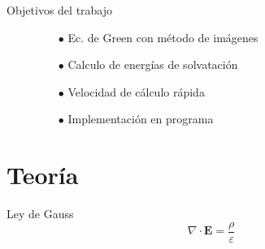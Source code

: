 \documentclass[serif,usenames,dvipsnames,landscape]{beamer}
\begin{document}
\begin{frame}{Objetivos del trabajo}
	\begin{figure}
		\begin{minipage}{0.4\slidewidth}
			\begin{itemize}
				\item[$\bullet$] Ec. de Green con método de imágenes
				\item[$\bullet$] Calculo de energías de solvatación
			\end{itemize}
		\end{minipage}%
		\vspace{1cm}
		\begin{minipage}{0.4\slidewidth}
			\begin{itemize}
				\item[$\bullet$] Velocidad de cálculo rápida
				\item[$\bullet$] Implementación en programa
			\end{itemize}
		\end{minipage}
		\begin{minipage}{0.55\slidewidth}
			
		\end{minipage}
		\vspace{-0.8cm}
	\end{figure}
\end{frame}

\section{Teoría}
	\begin{frame}{Ley de Gauss}
		\begin{equation*}
			\nabla\cdot\mathbf{E} = \frac{\rho}{\varepsilon}
		\end{equation*}
	\end{frame}
\end{document}

